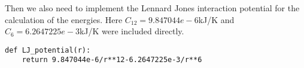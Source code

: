 \documentclass{article}[a4paper]
\begin{document}
Then we also need to implement the Lennard Jones interaction potential for the calculation of the energies. Here $C_{12}=9.847044e-6$kJ/K and $C_{6}=6.2647225e-3$kJ/K were included directly.
\begin{lstlisting}
def LJ_potential(r):
    return 9.847044e-6/r**12-6.2647225e-3/r**6 
\end{lstlisting}

\section{}
\end{document}
